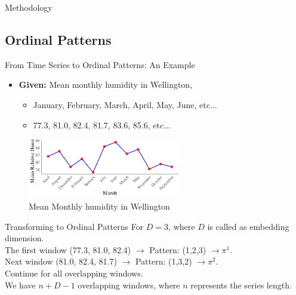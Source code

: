 \documentclass{beamer}
\begin{document}
\begin{frame}
	\begin{center}
		\alert{Methodology}
	\end{center}
\end{frame}

\subsection{Ordinal Patterns}

\begin{frame}{From Time Series to Ordinal Patterns: An Example}
	\begin{itemize}
		\item \textbf{Given:} Mean monthly humidity in Wellington,
		\begin{itemize}
			\item January, February, March, April, May, June, etc...
			\item 77.3, 81.0, 82.4, 81.7, 83.6, 85.6, etc... 
		\end{itemize}
	\end{itemize}
\begin{figure}[hbt]
	\centering
	\includegraphics[width=0.6\textwidth]{humidity graph}
	\caption{Mean Monthly humidity in Wellington}
	\label{fig:humidity}
\end{figure}	
	
\end{frame}

\begin{frame}{Transforming to Ordinal Patterns}
	For $D=3$, where $D$ is called as \alert{embedding dimension}.\\ 
	The first window (77.3, 81.0, 82.4) $\rightarrow$ Pattern: (1,2,3) $\rightarrow \pi^1$.\\ 
	Next window (81.0, 82.4, 81.7) $\rightarrow$ Pattern: (1,3,2) $\rightarrow \pi^2$.\\
	Continue for all overlapping windows.\\
	We have $n+D-1$ overlapping windows, where $n$ represents the series length. 
\end{frame}
\end{document}
